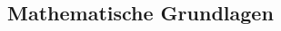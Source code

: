\documentclass[fs, footer]{latex4ei}
\begin{document}
\begin{multicols*}{4}





\section{Mathematische Grundlagen}
\end{multicols*}
\end{document}
